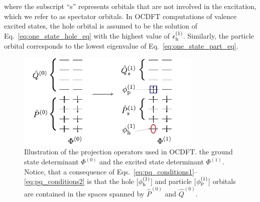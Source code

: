 \documentclass[8.5pt,twoside,twocolumn]{article}
\begin{document}
where the subscript ``s'' represents orbitals that are not involved in the excitation, which we refer to as spectator orbitals.
In OCDFT computations of valence excited states, the hole orbital is assumed to be the solution of Eq.~\eqref{eq:one_state_hole_eq} with the highest value of $\epsilon^{(1)}_{\rm h}$.  Similarly, the particle orbital corresponds to the lowest eigenvalue of Eq.~\eqref{eq:one_state_part_eq}.
\begin{figure}
\centering
\includegraphics[width=8.8cm]{Figure1.pdf}
\caption{Illustration of the projection operators used in OCDFT.   the ground state determinant $\Phi^{(0)}$ and the excited state determinant $\Phi^{(1)}$. Notice, that a consequence of Eqs.~\eqref{eq:pq_conditions1}--\eqref{eq:pq_conditions2} is that the hole [$\phi^{(1)}_{\rm h}$] and particle [$\phi^{(1)}_{\rm p}$] orbitals are contained in the spaces spanned by $\hat{P}^{(0)}$ and $\hat{Q}^{(0)}$.}
\label{fig:projection}
\end{figure}
\end{document}
